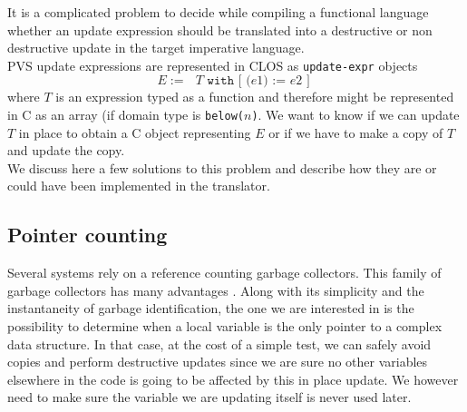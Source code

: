 \documentclass[12pt,a4paper]{article}
\newcommand{\cl}[1]{\texttt{#1}}
\begin{document}
It is a complicated problem to decide while compiling a functional language whether an update expression should be translated into a destructive or non destructive update in the target imperative language.\\

PVS update expressions are represented in CLOS as \texttt{update-expr} objects
$$ E := \cl{ $T$ with [ ($e1$) := $e2$ ] } $$
where $T$ is an expression typed as a function and therefore might be represented in C as an array (if domain type is \cl{below($n$)}.
We want to know if we can update $T$ in place to obtain a C object representing $E$ or if we have to make a copy of $T$ and update the copy.\\

We discuss here a few solutions to this problem and describe how they are or could have been implemented in the translator.

\subsection{Pointer counting}

Several systems rely on a reference counting garbage collectors. This family of garbage collectors has many advantages \cite{jonesgarbage}. Along with its simplicity and the instantaneity of garbage identification, the one we are interested in is the possibility to determine when a local variable is the only pointer to a complex data structure. In that case, at the cost of a simple test, we can safely avoid copies and perform destructive updates since we are sure no other variables elsewhere in the code is going to be affected by this in place update. We however need to make sure the variable we are updating itself is never used later.
\end{document}
